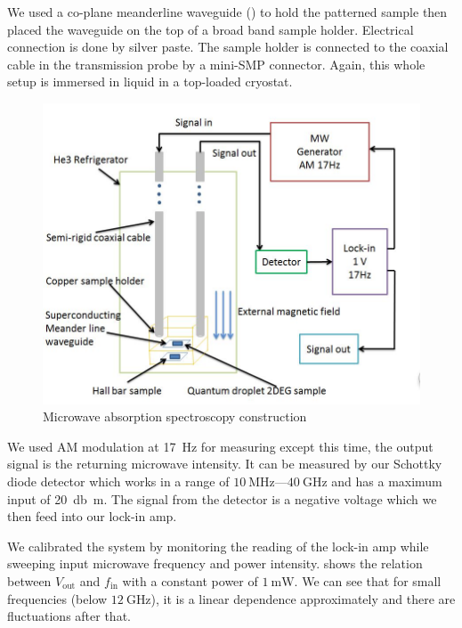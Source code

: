 \documentclass[12pt]{ruthesis}
\begin{document}
We used a co-plane meanderline waveguide (\cite{APLBroadbandESR}) to hold the patterned sample then placed the waveguide on the top of a broad band sample holder.
Electrical connection is done by silver paste.  
The sample holder is connected to the coaxial cable in the transmission probe by a mini-SMP connector.
Again, this whole setup is immersed in  liquid in a top-loaded cryostat.


\begin{figure}
  \centering
  \includegraphics[scale=0.25]{figures/configuration.JPG}
  \caption{Microwave absorption spectroscopy construction}
  \label{configuration}
\end{figure}
 
We used AM modulation at \SI{17}{\hertz} for measuring except this time, the output signal is the returning microwave intensity. It can be measured by our Schottky diode detector which works in a range of $\SI{10}{\mega \hertz}$---$\SI{40}{\giga \hertz}$ and has a maximum input of \SI{20}{\decibel\meter}. 
The signal from the detector is a negative voltage which we then feed into our lock-in amp.

We calibrated the system by monitoring the reading of the lock-in amp while sweeping input microwave frequency and power intensity.
 shows the relation between $V_{\mathrm{out}}$ and $f_{\mathrm{in}}$ with a constant power of $\SI{1}{\milli \watt}$. We can see that for small frequencies (below $\SI{12}{\giga \hertz}$), it is a linear dependence approximately and there are fluctuations after that.
\end{document}
